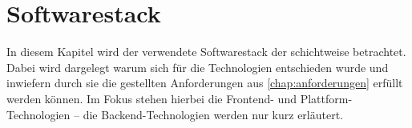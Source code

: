 \chapter{Softwarestack}
\label{chap:softwarestack}

In diesem Kapitel wird der verwendete Softwarestack der \shst{} schichtweise
betrachtet. Dabei wird dargelegt warum sich für die Technologien entschieden
wurde und inwiefern durch sie die gestellten Anforderungen aus \autoref{chap:anforderungen}
erfüllt werden können. Im Fokus stehen hierbei die Frontend- und Plattform-Technologien -- die
Backend-Technologien werden nur kurz erläutert.



